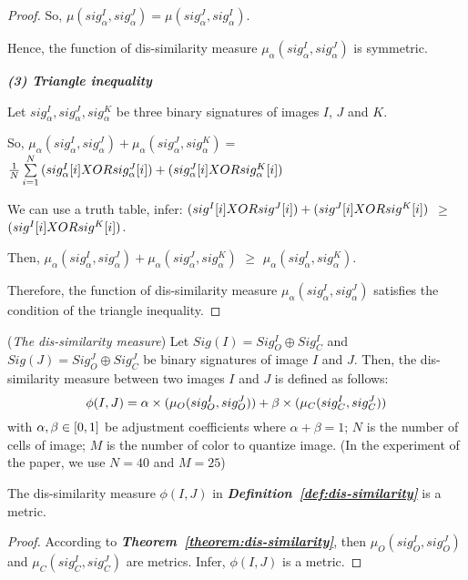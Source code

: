 \documentclass{amcs}
\begin{document}
\begin{proof}{}
So, $\mu (sig_\alpha ^I,sig_\alpha ^J) = \mu (sig_\alpha ^J,sig_\alpha ^I)$. 

Hence, the function of dis-similarity measure ${\mu _\alpha }(sig_\alpha ^I,sig_\alpha ^J)$ is symmetric.

\textit{\textbf{(3) Triangle inequality}}

Let $sig_\alpha ^I,sig_\alpha ^J,sig_\alpha ^K$ be three binary signatures of images $I$, $J$ and $K$. 

So, ${\mu _\alpha }(sig_\alpha ^I,sig_\alpha ^J) + {\mu _\alpha }(sig_\alpha ^J,sig_\alpha ^K) = $ $\frac{1}{N}\sum\limits_{i = 1}^N {(sig_\alpha ^I[i]{\rm{ }}XOR{\rm{ }}sig_\alpha ^J[i]){\rm{ }} + {\rm{ }}(sig_\alpha ^J[i]{\rm{ }}XOR{\rm{ }}sig_\alpha ^K[i])} $

We can use a truth table,  infer: $(si{g^I}[i]{\rm{ }}XOR{\rm{ }}si{g^J}[i]) + (si{g^J}[i]{\rm{ }}XOR{\rm{ }}si{g^K}[i])$ $ \ge $ $(si{g^I}[i]{\rm{ }}XOR{\rm{ }}si{g^K}[i])$. 

Then, ${\mu _\alpha }(sig_\alpha ^I,sig_\alpha ^J) + {\mu _\alpha }(sig_\alpha ^J,sig_\alpha ^K)$ $ \ge $ ${\mu _\alpha }(sig_\alpha ^I,sig_\alpha ^K)$. 

Therefore, the function of dis-similarity measure ${\mu _\alpha }(sig_\alpha ^I,sig_\alpha ^J)$  satisfies the condition of the triangle inequality.
\end{proof}

\begin{definition}{}(\textit{The dis-similarity measure})
Let $Sig(I) = Sig_O^I \oplus Sig_C^I$ and $Sig(J) = Sig_O^J \oplus Sig_C^J$ be binary signatures of image $I$ and $J$. Then, the dis-similarity measure between two images $I$ and $J$ is defined as follows:
\begin{equation}
\small \phi (I,J) = \alpha  \times ({\mu _O}(sig_O^I,sig_O^J)) + \beta  \times ({\mu _C}(sig_C^I,sig_C^J))
\end{equation}
with $\alpha ,\beta  \in {\rm{[}}0,1]$ be adjustment coefficients where $\alpha  + \beta  = 1$; $N$ is the number of cells of image; $M$ is the number of color to quantize image. (In the experiment of the paper, we use $N=40$ and $M = 25$)
\label{def:dis-similarity}
\end{definition}

\begin{theorem}{} The dis-similarity measure $\phi (I,J)$ in \textbf{\textit{Definition~\ref{def:dis-similarity}}} is a metric.
\label{theorem:metric}
\end{theorem}
\begin{proof}{}
According to \textbf{\textit{Theorem~\ref{theorem:dis-similarity}}}, then ${\mu _O}(sig_O^I,sig_O^J)$ and ${\mu _C}(sig_C^I,sig_C^J)$ are metrics. Infer, $\phi (I,J)$ is a metric.
\end{proof}
\end{document}
